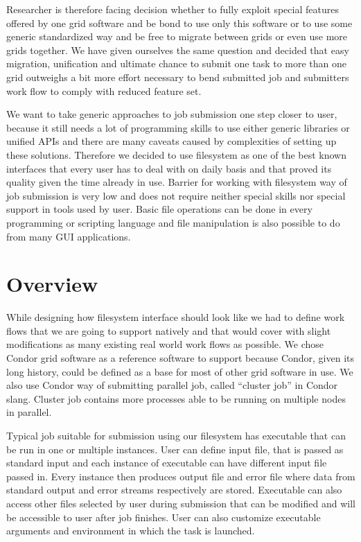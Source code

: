 \documentclass[a4paper,10pt,twocolumn]{article}
\newcommand{\term}[1]{``#1''}
\begin{document}
Researcher is therefore facing decision whether to fully exploit special features offered by one grid software and be bond to use only this software or to use some generic standardized way and be free to migrate between grids or even use more grids together. We have given ourselves the same question and decided that easy migration, unification and ultimate chance to submit one task to more than one grid outweighs a bit more effort necessary to bend submitted job and submitters work flow to comply with reduced feature set.

We want to take generic approaches to job submission one step closer to user, because it still needs a lot of programming skills to use either generic libraries or unified APIs and there are many caveats caused by complexities of setting up these solutions. Therefore we decided to use filesystem as one of the best known interfaces that every user has to deal with  on daily basis and that proved its quality given the time already in use. Barrier for working with filesystem way of job submission is very low and does not require neither special skills nor special support in tools used by user. Basic file operations can be done in every programming or scripting language and file manipulation is also possible to do from many GUI applications.

\section{Overview}

While designing how filesystem interface should look like we had to define work flows that we are going to support natively and that would cover with slight modifications as many existing real world work flows as possible. We chose Condor grid software as a reference software to support because Condor, given its long history, could be defined as a base for most of other grid software in use. We also use Condor way of submitting parallel job, called \term{cluster job} in Condor slang. Cluster job contains more processes able to be running on multiple nodes in parallel.

Typical job suitable for submission using our filesystem has executable that can be run in one or multiple instances. User can define input file, that is passed as standard input and each instance of executable can have different input file passed in. Every instance then produces output file and error file where data from standard output and error streams respectively are stored. Executable can also access other files selected by user during submission that can be modified and will be accessible to user after job finishes. User can also customize executable arguments and environment in which the task is launched.
\end{document}
